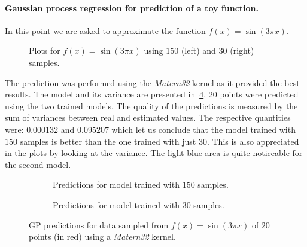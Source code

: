 \paragraph{Gaussian process regression for prediction of a toy function.} In
this point we are asked to approximate the function $f(x) = \sin(3\pi x)$.

\begin{figure}
  \centering
  
  \caption{Plots for $f(x) = \sin(3\pi x)$ using $150$ (left) and $30$ (right)
  samples.}
  \label{fig_gpsamples}
\end{figure}

The prediction was performed using the \emph{Matern32} kernel as it provided the
best results. The model and its variance are presented
in~\cref{fig_gppredftest}. $20$ points were predicted using the two trained
models. The quality of the predictions is measured by the sum of variances
between real and estimated values. The respective quantities were: $0.000132$
and $0.095207$ which let us conclude that the model trained with $150$ samples
is better than the one trained with just $30$. This is also appreciated in the
plots by looking at the variance. The light blue area is quite noticeable for
the second model.

\begin{figure}
  \begin{subfigure}[h]{.5\linewidth}
    
    \caption{Predictions for model trained with $150$ samples.}
    \label{fig_predftest}
  \end{subfigure}
  \begin{subfigure}[h]{.5\linewidth}
    
    \caption{Predictions for model trained with $30$ samples.}
    \label{fig_predftest2}
  \end{subfigure}
  \caption{GP predictions for data sampled from $f(x) = \sin(3\pi x)$ of $20$
   points (in red) using a \emph{Matern32} kernel.}
  \label{fig_gppredftest}
\end{figure}
